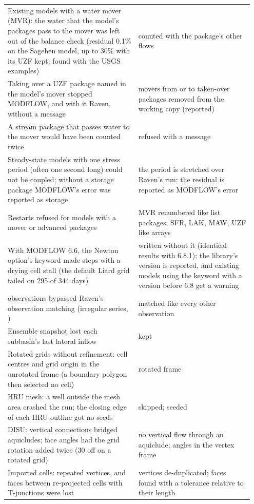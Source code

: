 \begin{longtable}{P{0.508\linewidth}P{0.44\linewidth}}
Existing models with a water mover (MVR): the water that the model's packages pass to the mover was left out of the balance check (residual 0.1\% on the Sagehen model, up to 30\% with its UZF kept; found with the USGS examples) & counted with the package's other flows\\
Taking over a UZF package named in the model's mover stopped MODFLOW, and with it Raven, without a message & movers from or to taken-over packages removed from the working copy (reported)\\
A stream package that passes water to the mover would have been counted twice & refused with a message\\
Steady-state models with one stress period (often one second long) could not be coupled; without a storage package MODFLOW's error was reported as storage & the period is stretched over Raven's run; the residual is reported as MODFLOW's error\\
Restarts refused for models with a mover or advanced packages & MVR renumbered like list packages; SFR, LAK, MAW, UZF like arrays\\
With MODFLOW 6.6, the Newton option's  keyword made steps with a drying cell stall (the default Liard grid failed on 295 of 344 days) &  written without it (identical results with 6.8.1); the library's version is reported, and existing models using the keyword with a version before 6.8 get a warning\\
 observations bypassed Raven's observation matching (irregular series, ) & matched like every other observation\\
Ensemble snapshot lost each subbasin's last lateral inflow & kept\\
Rotated grids without refinement: cell centres and grid origin in the unrotated frame (a boundary polygon then selected no cell) & rotated frame\\
HRU mesh: a well outside the mesh area crashed the run; the closing edge of each HRU outline got no seeds & skipped; seeded\\
DISU: vertical connections bridged aquicludes; face angles had the grid rotation added twice (30\textdegree{} off on a rotated grid) & no vertical flow through an aquiclude; angles in the vertex frame\\
Imported cells: repeated vertices, and faces between re-projected cells with T-junctions were lost & vertices de-duplicated; faces found with a tolerance relative to their length\\

\end{longtable}
